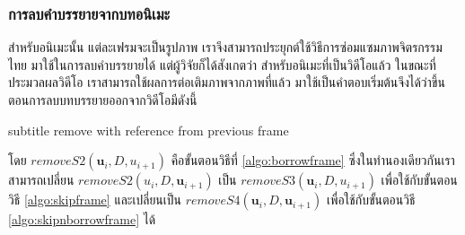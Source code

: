 \documentclass[hidelinks, a4paper,12pt]{article}
\numberwithin{equation}{section}							%
\numberwithin{equation}{section}
\begin{document}
{	\subsubsection{การลบคำบรรยายจากบทอนิเมะ}
	\hspace{1cm} สำหรับอนิเมะนั้น แต่ละเฟรมจะเป็นรูปภาพ เราจึงสามารถประยุกต์ใช้วิธีการซ่อมแซมภาพจิตรกรรมไทย มาใช้ในการลบคำบรรยายได้ แต่ผู้วิจัยก็ได้สังเกตว่า สำหรับอนิเมะที่เป็นวิดีโอแล้ว ในขณะที่ประมวลผลวิดีโอ เราสามารถใช้ผลการต่อเติมภาพจากภาพที่แล้ว มาใช้เป็นคำตอบเริ่มต้นจึงได้ว่าขึ้นตอนการลบบทบรรยายออกจากวิดีโอมีดังนี้\\
	\begin{algorithm}[H]
		\caption{subtitle remove with reference from previous frame}
	\end{algorithm}
	\hspace{1cm} โดย $removeS2(\boldsymbol{u}_{i},D,u_{i+1})$  คือขั้นตอนวิธีที่ \ref{algo:borrowframe} ซึ่งในทำนองเดียวกันเราสามารถเปลี่ยน $removeS2(u_{i},D,\boldsymbol{u}_{i+1})$ เป็น $removeS3(\boldsymbol{u}_{i},D,u_{i+1})$ เพื่อใช้กับขั้นตอนวิธี \ref{algo:skipframe} และเปลี่ยนเป็น  $removeS4(\boldsymbol{u}_{i},D,\boldsymbol{u}_{i+1})$ เพื่อใช้กับขั้นตอนวิธี \ref{algo:skipnborrowframe} ได้
	
}
\end{document}
